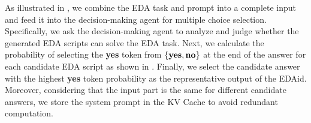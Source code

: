 As illustrated in , we combine the EDA task and prompt into a complete input and feed it into the decision-making agent for multiple choice selection. 
Specifically, we ask the decision-making agent to analyze and judge whether the generated EDA scripts can solve the EDA task.
Next, we calculate the probability of selecting the \textbf{yes} token from $\{\text{\textbf{yes}}, \text{\textbf{no}}\}$ at the end of the answer for each candidate EDA script as shown in .
Finally, we select the candidate answer with the highest \textbf{yes} token probability as the representative output of the EDAid.
Moreover, considering that the input part is the same for different candidate answers, we store the system prompt in the KV Cache to avoid redundant computation.	